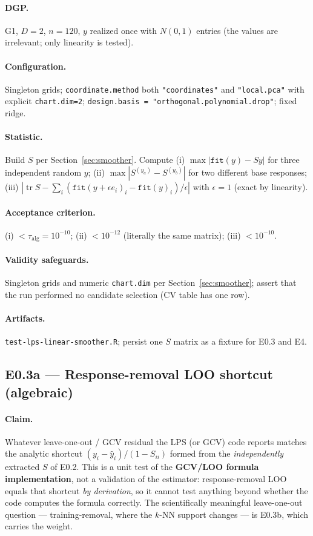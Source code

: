 \documentclass[11pt]{article}
\newcommand{\code}[1]{\texttt{#1}}
\newcommand{\tr}{\operatorname{tr}}
\begin{document}
\paragraph{DGP.} G1, $D=2$, $n=120$, $y$ realized once with $N(0,1)$ entries (the values are
irrelevant; only linearity is tested).

\paragraph{Configuration.} Singleton grids; \code{coordinate.method} both
\code{"coordinates"} and \code{"local.pca"} with explicit \code{chart.dim=2};
\code{design.basis = "orthogonal.polynomial.drop"}; fixed ridge.

\paragraph{Statistic.} Build $S$ per Section~\ref{sec:smoother}. Compute
(i) $\max|{\texttt{fit}(y)}-Sy|$ for three independent random $y$; (ii) $\max|S^{(y_a)}-S^{(y_b)}|$
for two different base responses; (iii) $|\tr S - \sum_i (\texttt{fit}(y+ \epsilon e_i)_i-\texttt{fit}(y)_i)/\epsilon|$
with $\epsilon=1$ (exact by linearity).

\paragraph{Acceptance criterion.} (i) $<\tau_{\mathrm{alg}}=10^{-10}$; (ii) $<10^{-12}$
(literally the same matrix); (iii) $<10^{-10}$.

\paragraph{Validity safeguards.} Singleton grids and numeric \code{chart.dim} per
Section~\ref{sec:smoother}; assert that the run performed no candidate selection (CV table
has one row).

\paragraph{Artifacts.} \code{test-lps-linear-smoother.R}; persist one $S$ matrix as a fixture
for E0.3 and E4.

\subsection{E0.3a — Response-removal LOO shortcut (algebraic)}

\paragraph{Claim.} Whatever leave-one-out / GCV residual the LPS (or GCV) code reports matches
the analytic shortcut $(y_i-\hat y_i)/(1-S_{ii})$ formed from the \emph{independently} extracted
$S$ of E0.2. This is a unit test of the \textbf{GCV/LOO formula implementation}, not a validation
of the estimator: response-removal LOO equals that shortcut \emph{by derivation}, so it cannot
test anything beyond whether the code computes the formula correctly. The scientifically
meaningful leave-one-out question --- training-removal, where the $k$-NN support changes --- is
E0.3b, which carries the weight.
\end{document}
